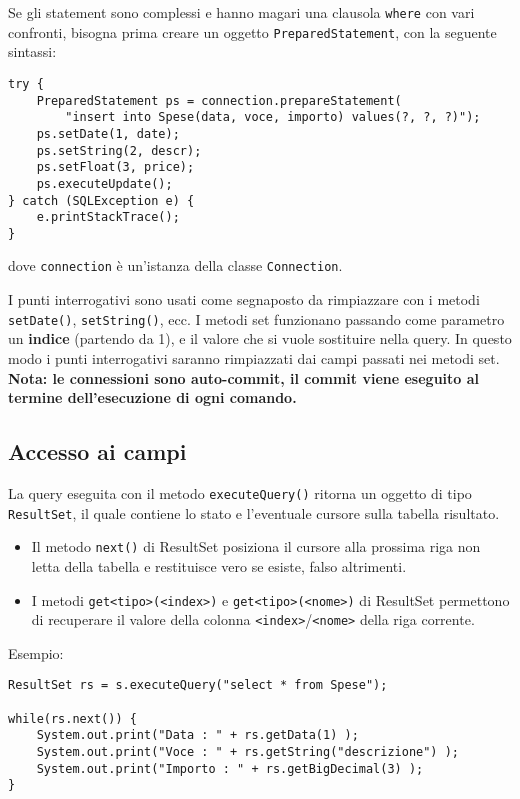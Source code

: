\documentclass[a4paper, 10pt, titlepage]{article}
\begin{document}
Se gli statement sono complessi e hanno magari una clausola \lstinline|where| con vari confronti, bisogna prima creare un oggetto \lstinline|PreparedStatement|, con la seguente sintassi:

\begin{lstlisting}
try {
	PreparedStatement ps = connection.prepareStatement(
		"insert into Spese(data, voce, importo) values(?, ?, ?)");
	ps.setDate(1, date);
	ps.setString(2, descr);
	ps.setFloat(3, price);
	ps.executeUpdate();
} catch (SQLException e) {
	e.printStackTrace();
}
\end{lstlisting}
dove \lstinline|connection| è un'istanza della classe \lstinline|Connection|. 

I punti interrogativi sono usati come segnaposto da rimpiazzare con i metodi \lstinline|setDate()|, \lstinline|setString()|, ecc.
I metodi set funzionano passando come parametro un \textbf{indice} (partendo da 1), e il valore che si vuole sostituire nella query.
In questo modo i punti interrogativi saranno rimpiazzati dai campi passati nei metodi set. \\
\textbf{Nota: le connessioni sono auto-commit, il commit viene eseguito al termine dell'esecuzione di ogni comando.}

\subsection{Accesso ai campi}
La query eseguita con il metodo \lstinline|executeQuery()| ritorna un oggetto di tipo \lstinline|ResultSet|, il quale contiene lo stato e l'eventuale cursore sulla tabella risultato.
\begin{itemize}
\item Il metodo \lstinline|next()| di ResultSet posiziona il cursore alla prossima riga non letta della tabella e restituisce vero se esiste, falso altrimenti.
\item I metodi \lstinline|get<tipo>(<index>)| e \lstinline|get<tipo>(<nome>)| di ResultSet permettono di recuperare il valore della colonna \lstinline|<index>|/\lstinline|<nome>| della riga corrente.
\end{itemize}
Esempio:
\begin{lstlisting}
ResultSet rs = s.executeQuery("select * from Spese");

while(rs.next()) {
	System.out.print("Data : " + rs.getData(1) );
	System.out.print("Voce : " + rs.getString("descrizione") );
	System.out.print("Importo : " + rs.getBigDecimal(3) );
}
\end{lstlisting}
\end{document}
